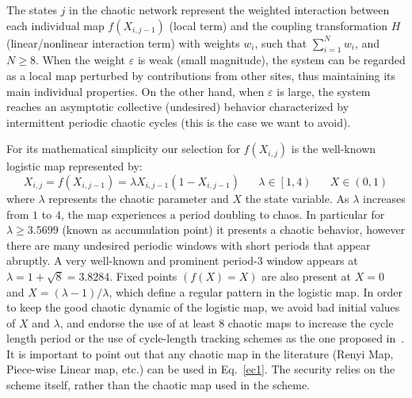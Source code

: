\documentclass[preprint]{elsarticle}
\begin{document}
The states $j$ in the chaotic network represent the weighted interaction between each individual map $f(X_{i,j-1})$ (local term) and the coupling transformation $H$ (linear/nonlinear interaction term) with weights $w_{i}$, such that $\sum_{i=1}^{N}w_{i}$, and $N \geq 8$. When the weight $\varepsilon$ is weak (small magnitude), the system can be regarded as a local map perturbed by contributions from other sites, thus maintaining its main individual properties. On the other hand, when $\varepsilon$ is large, the system reaches an asymptotic collective (undesired) behavior characterized by intermittent periodic chaotic cycles (this is the case we want to avoid).

For its mathematical simplicity our selection for $f(X_{i,j})$ is the well-known logistic map represented by:
\begin{equation}
\displaystyle{
X_{i,j}= f(X_{i,j-1})= \lambda X_{i,j-1}(1-X_{i,j-1}) \; \; \; \;\; \; \lambda \in \left[ 1,4 \right) \; \;  \;\;\; \; X \in \left( 0,1 \right)
}
\label{ec2}
\end{equation}
where $\lambda$ represents the chaotic parameter and $X$ the state variable. As $\lambda$ increases from $1$ to $4$, the map experiences a period doubling to chaos. In particular for $\lambda \geq 3.5699$ (known as accumulation point) it presents a chaotic behavior, however there are many undesired periodic windows with short periods that appear abruptly. A very well-known and prominent period-3 window appears at $\lambda = 1+ \sqrt{8}= 3.8284$. Fixed points $(f(X)=X)$ are also present at $X=0$ and $X=(\lambda -1)/\lambda$, which define a regular pattern in the logistic map. In order to keep the good chaotic dynamic of the logistic map, we avoid bad initial values of $X$ and $\lambda$, and endorse the use of at least 8 chaotic maps to increase the cycle length period or the use of cycle-length tracking schemes as the one proposed in~\cite{Hasimoto2011}. It is important to point out that any chaotic map in the literature (Renyi Map, Piece-wise Linear map, etc.) can be used in Eq.~\ref{ec1}. The security relies on the scheme itself, rather than the chaotic map used in the scheme.
\end{document}
